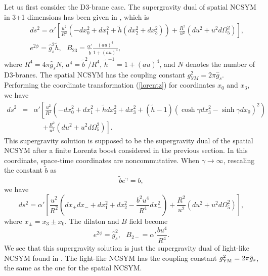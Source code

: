 \documentclass[a4paper,12pt]{article}
\begin{document}
Let us first consider the D3-brane case. The supergravity dual of spatial
NCSYM in 3+1 dimensions has been given in \cite{Mald2,Has}, which
is
\begin{eqnarray}
&& ds^2 =\alpha' \left [\frac{u^2}{R^2}\left (-dx_0^2 +dx_1^2 +\tilde{h}
   (dx_2^2 +dx_3^2)\right)
 +\frac{R^2}{u^2}\left( du^2 +u^2 d\Omega_5^2\right)\right], \nonumber \\
&& e^{2\phi}=\hat{g}_s^2 \tilde{h}, \ \ \ B_{23}=\frac{\alpha'}{\tilde{b}}
  \frac{(au)^4}{1+(au)^4},
\end{eqnarray}
where $R^4 =4\pi \hat{g}_s N$, $a^4 =\tilde{b}^2/R^4$, $\tilde{h}^{-1}
=1+(au)^4$, and $N$ denotes the number of D3-branes. The spatial NCSYM
has the coupling constant $g_{YM}^2=2 \pi\hat{g}_s$.
 Performing the coordinate transformation (\ref{lorentz}) for coordinates
$x_0$ and $x_3$, we have
\begin{eqnarray}
ds^2 &=& \alpha' \left [\frac{u^2}{R^2}\left (-dx_0^2 +dx_1^2 + \tilde{h}
 dx_2^2 +dx_3^2 +(\tilde{h}-1) (\cosh\gamma dx_3^2 -\sinh\gamma dx_0)^2
  \right) \right. \nonumber \\
 && ~~~~~~\left. +\frac{R^2}{u^2}\left (du^2 +u^2 d\Omega_5^2\right)\right].
\end{eqnarray}
This supergravity solution is supposed to be the supergravity dual of the
spatial NCSYM after a finite Lorentz boost considered in the
previous section. In this coordinate, space-time coordinates are noncommutative.
When $\gamma \to \infty$, rescaling the constant $\tilde{b}$ as
\begin{equation}
\label{b}
\tilde{b} e^{\gamma} = b,
\end{equation}
we have
\begin{equation}
\label{lightsym}
ds^2 =\alpha' \left[ \frac{u^2}{R^2}\left (dx_+ dx_- +dx_1^2 +dx_2^2
  -\frac{b^2 u^4}{R^4}dx_-^2\right) +\frac{R^2}{u^2}
 \left (du^2 +u^2 d\Omega_5^2\right)\right],
\end{equation}
where $x_{\pm}= x_3 \pm x_0$. The dilaton and $B$ field become
\begin{equation}
e^{2\phi}=\hat{g}_s^2, \ \ \ B_{2-}=\alpha' \frac{b u^4}{R^4}.
\end{equation}
We see that this supergravity solution is just the supergravity dual
of light-like NCSYM found in \cite{AOR}. The light-like
NCSYM has the coupling constant $g^2_{\rm YM}=2\pi \hat{g}_s$,
the same as the one for the spatial NCSYM.
\end{document}
